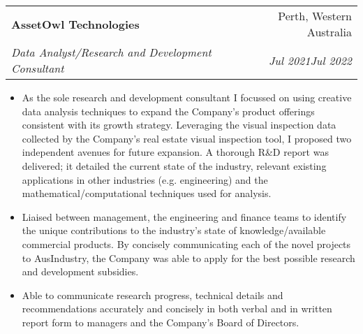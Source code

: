 \documentclass[letterpaper,10.8pt]{article}
\makeatletter
\newcommand{\resumeItem}[2]{
  \item\small{
    \textbf{#1}{#2 \vspace{-2pt}}
  }
}
\newcommand{\resumeSubheading}[4]{
  \vspace{-1pt}\item
    \begin{tabular*}{0.97\textwidth}{l@{\extracolsep{\fill}}r}
      \textbf{#1} & #2 \\
      \textit{\small#3} & \textit{\small #4} \\
    \end{tabular*}\vspace{-5pt}
}
\newcommand{\resumeItemListStart}{\begin{itemize}}
\newcommand{\resumeItemListEnd}{\end{itemize}\vspace{-5pt}}
\makeatother
\begin{document}
    \resumeSubheading
    {AssetOwl Technologies}{Perth, Western Australia}
    {Data Analyst/Research and Development Consultant}{Jul 2021\textendash Jul 2022}
    \resumeItemListStart
        \resumeItem{}{As the sole research and development consultant I focussed on using creative data analysis techniques to expand the Company's product offerings consistent with its growth strategy. Leveraging the visual inspection data collected by the Company's real estate visual inspection tool, I proposed two independent avenues for future expansion. A thorough R\&D report was delivered; it detailed the current state of the industry, relevant existing applications in other industries (e.g. engineering) and the mathematical/computational techniques used for analysis.}
        \resumeItem{}{Liaised between management, the engineering and finance teams to identify the unique contributions to the industry's state of knowledge/available commercial products. By concisely communicating each of the novel projects to AusIndustry, the Company was able to apply for the best possible research and development subsidies.}
        \resumeItem{}{Able to communicate research progress, technical details and recommendations accurately and concisely in both verbal and in written report form to managers and the Company's Board of Directors.}
    \resumeItemListEnd
      
\end{document}
